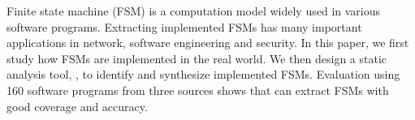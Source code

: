 Finite state machine (FSM) is a computation model widely 
used in various software programs. 
Extracting implemented FSMs has many important applications in 
network, software engineering and security. 
In this paper, we first study how FSMs are implemented in the real world.
We then design a static analysis tool, \Tool{}, to identify and synthesize 
implemented FSMs. 
Evaluation using 160 software programs from three sources shows that 
\Tool{} can extract FSMs with good coverage and accuracy. 
